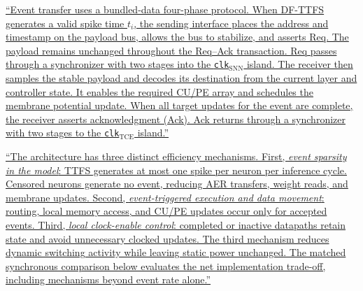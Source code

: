 \documentclass[12pt,technote,onecolumn]{IEEEtran}
\begin{document}
\uline{``Event transfer uses a bundled-data four-phase protocol. When DF-TTFS generates a valid spike time $t_i$, the sending interface places the address and timestamp on the payload bus, allows the bus to stabilize, and asserts Req. The payload remains unchanged throughout the Req--Ack transaction. Req passes through a synchronizer with two stages into the \texttt{clk}$_{\mathrm{SNN}}$ island. The receiver then samples the stable payload and decodes its destination from the current layer and controller state. It enables the required CU/PE array and schedules the membrane potential update. When all target updates for the event are complete, the receiver asserts acknowledgment (Ack). Ack returns through a synchronizer with two stages to the \texttt{clk}$_{\mathrm{TCE}}$ island.''}

\uline{``The architecture has three distinct efficiency mechanisms. First, \emph{event sparsity in the model}: TTFS generates at most one spike per neuron per inference cycle. Censored neurons generate no event, reducing AER transfers, weight reads, and membrane updates. Second, \emph{event-triggered execution and data movement}: routing, local memory access, and CU/PE updates occur only for accepted events. Third, \emph{local clock-enable control}: completed or inactive datapaths retain state and avoid unnecessary clocked updates. The third mechanism reduces dynamic switching activity while leaving static power unchanged. The matched synchronous comparison below evaluates the net implementation trade-off, including mechanisms beyond event rate alone.''}
\end{document}
